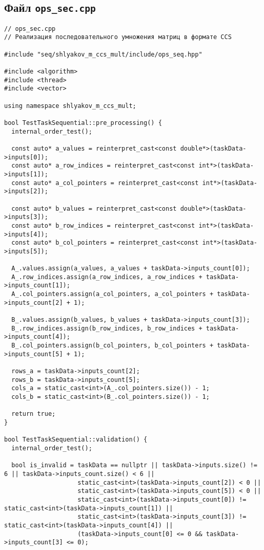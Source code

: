 \documentclass[12pt]{article}
\begin{document}
\subsection*{Файл \texttt{ops\_sec.cpp}}
\begin{verbatim}
// ops_sec.cpp
// Реализация последовательного умножения матриц в формате CCS

#include "seq/shlyakov_m_ccs_mult/include/ops_seq.hpp"

#include <algorithm>
#include <thread>
#include <vector>

using namespace shlyakov_m_ccs_mult;

bool TestTaskSequential::pre_processing() {
  internal_order_test();

  const auto* a_values = reinterpret_cast<const double*>(taskData->inputs[0]);
  const auto* a_row_indices = reinterpret_cast<const int*>(taskData->inputs[1]);
  const auto* a_col_pointers = reinterpret_cast<const int*>(taskData->inputs[2]);

  const auto* b_values = reinterpret_cast<const double*>(taskData->inputs[3]);
  const auto* b_row_indices = reinterpret_cast<const int*>(taskData->inputs[4]);
  const auto* b_col_pointers = reinterpret_cast<const int*>(taskData->inputs[5]);

  A_.values.assign(a_values, a_values + taskData->inputs_count[0]);
  A_.row_indices.assign(a_row_indices, a_row_indices + taskData->inputs_count[1]);
  A_.col_pointers.assign(a_col_pointers, a_col_pointers + taskData->inputs_count[2] + 1);

  B_.values.assign(b_values, b_values + taskData->inputs_count[3]);
  B_.row_indices.assign(b_row_indices, b_row_indices + taskData->inputs_count[4]);
  B_.col_pointers.assign(b_col_pointers, b_col_pointers + taskData->inputs_count[5] + 1);

  rows_a = taskData->inputs_count[2];
  rows_b = taskData->inputs_count[5];
  cols_a = static_cast<int>(A_.col_pointers.size()) - 1;
  cols_b = static_cast<int>(B_.col_pointers.size()) - 1;

  return true;
}

bool TestTaskSequential::validation() {
  internal_order_test();

  bool is_invalid = taskData == nullptr || taskData->inputs.size() != 6 || taskData->inputs_count.size() < 6 ||
                    static_cast<int>(taskData->inputs_count[2]) < 0 ||
                    static_cast<int>(taskData->inputs_count[5]) < 0 ||
                    static_cast<int>(taskData->inputs_count[0]) != static_cast<int>(taskData->inputs_count[1]) ||
                    static_cast<int>(taskData->inputs_count[3]) != static_cast<int>(taskData->inputs_count[4]) ||
                    (taskData->inputs_count[0] <= 0 && taskData->inputs_count[3] <= 0);


\end{verbatim}
\end{document}
